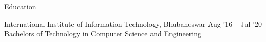 \documentclass{resume} %
\begin{document}

\begin{rSection}{Education}
  \begin{rEducationSection}{International Institute of Information Technology, Bhubaneswar}
                           {Aug '16 -- Jul '20}
                           {Bachelors of Technology in Computer Science and Engineering}
  \end{rEducationSection}
\end{rSection}
\end{document}
